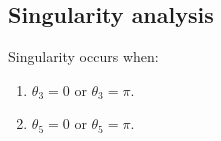 \documentclass{article}
\begin{document}













\subsection{Singularity analysis}

Singularity occurs when:
\begin{enumerate}
    \item $\theta_3 = 0$ or $\theta_3 = \pi$. 
    \item $\theta_5 = 0$ or $\theta_5 = \pi$. 
\end{enumerate}
\end{document}
